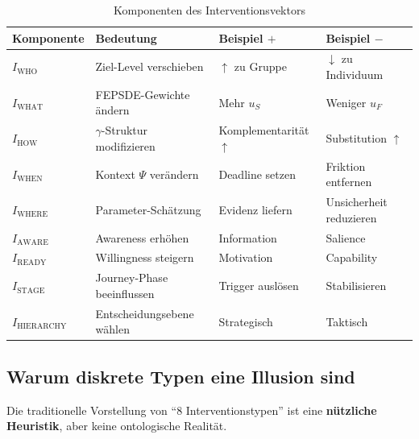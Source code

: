 \begin{table}[htbp]
\centering
\caption{Komponenten des Interventionsvektors}
\label{tab:17-vector-components}
\renewcommand{\arraystretch}{1.3}
\small
\begin{tabular}{@{}llll@{}}
\toprule
\textbf{Komponente} & \textbf{Bedeutung} & \textbf{Beispiel $+$} & \textbf{Beispiel $-$} \\
\midrule
$I_{\text{WHO}}$ & Ziel-Level verschieben & $\uparrow$ zu Gruppe & $\downarrow$ zu Individuum \\
$I_{\text{WHAT}}$ & FEPSDE-Gewichte \"{a}ndern & Mehr $u_S$ & Weniger $u_F$ \\
$I_{\text{HOW}}$ & $\gamma$-Struktur modifizieren & Komplementarit\"{a}t $\uparrow$ & Substitution $\uparrow$ \\
$I_{\text{WHEN}}$ & Kontext $\Psi$ ver\"{a}ndern & Deadline setzen & Friktion entfernen \\
$I_{\text{WHERE}}$ & Parameter-Sch\"{a}tzung & Evidenz liefern & Unsicherheit reduzieren \\
$I_{\text{AWARE}}$ & Awareness erh\"{o}hen & Information & Salience \\
$I_{\text{READY}}$ & Willingness steigern & Motivation & Capability \\
$I_{\text{STAGE}}$ & Journey-Phase beeinflussen & Trigger ausl\"{o}sen & Stabilisieren \\
$I_{\text{HIERARCHY}}$ & Entscheidungsebene w\"{a}hlen & Strategisch & Taktisch \\
\bottomrule
\end{tabular}
\end{table}

\subsection{Warum diskrete Typen eine Illusion sind}
\label{sec:17-illusion}

Die traditionelle Vorstellung von ``8 Interventionstypen'' ist eine \textbf{n\"{u}tzliche Heuristik}, aber keine ontologische Realit\"{a}t.

